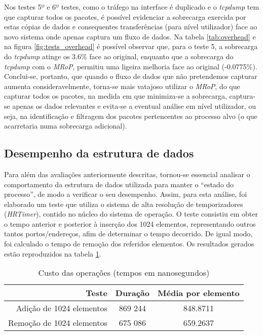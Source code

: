 Nos testes 5º e 6º testes, como o tráfego na interface é duplicado e o \textit{tcpdump} tem que capturar todos os pacotes, é possível evidenciar a sobrecarga exercida por estas cópias de dados e consequentes transferências (para nível utilizador) face ao novo sistema onde apenas captura um fluxo de dados.
Na tabela \ref{tab:overhead} e na figura \ref{fig:tests_overhead} é possível observar que, para o teste 5, a sobrecarga do \textit{tcpdump} atinge os 3.6\% face ao original, enquanto que a sobrecarga do \textit{tcpdump} com o \textit{MRoP}, permitiu uma ligeira melhoria face ao original (-0.0775\%).
Conclui-se, portanto, que quando o fluxo de dados que não pretendemos capturar aumenta consideravelmente, torna-se mais vatajoso utilizar o \textit{MRoP}, do que capturar todos os pacotes, na medida em que minimiza-se a sobrecarga, captura-se apenas os dados relevantes e evita-se a eventual análise em nível utilizador, ou seja, na identificação e filtragem dos pacotes pertencentes ao processo alvo (o que acarretaria numa sobrecarga adicional).

\subsection{Desempenho da estrutura de dados}

Para além das avaliações anteriormente descritas, tornou-se essencial analisar o comportamento da estrutura de dados utilizada para manter o “estado do processo”, de modo a verificar o seu desempenho.
Assim, para esta análise, foi elaborado um teste que utiliza o sistema de alta resolução de temporizadores (\textit{HRTimer})\cite{hrtimerKernel}, contido no núcleo do sistema de operação.
O teste consistiu em obter o tempo anterior e posterior à inserção dos 1024 elementos, representando outros tantos portos/endereços, afim de determinar o tempo decorrido.
De igual modo, foi calculado o tempo de remoção dos referidos elementos. Os resultados gerados estão reproduzidos na tabela \ref{tab:tree_info}.

\begin{table}[!htb]
\begin{center}
\caption{Custo das operações (tempos em nanosegundos)}
\begin{tabular}{ | r | c | c | }
\hline
\hspace{1cm} Teste \hspace{1.5cm} & \hspace{1cm}Duração\hspace{1cm} &  Média por
elemento \\
\hline
Adição de 1024 elementos & 869 244 & 848.8711 \\
\hline
Remoção de 1024 elementos & 675 086 & 659.2637\\
\hline

\hline
\end{tabular}
\label{tab:tree_info}
\end{center}
\end{table}

